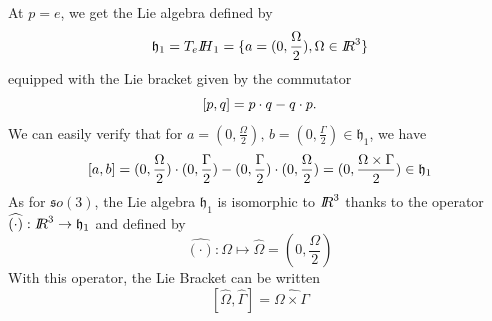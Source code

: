 At $p=e$, we get the Lie algebra defined by
\begin{equation}
  \label{eq:134}
  \mathfrak h_1 =  T_e{\mbox{\rm $I\!\!H$}_1} =  \{ a = (0, \frac \Omega 2 ), \Omega \in \mbox{\rm $I\!\!R$}^3 \}
\end{equation}
equipped with the Lie bracket given by the commutator
\begin{equation}
  \label{eq:135}
  [p,q] = p \cdot q- q\cdot p.
\end{equation}
We can easily verify that for $a = (0, \frac \Omega 2 ), \, b = (0, \frac \Gamma 2 ) \in \mathfrak h_1 $, we have
\begin{equation}
  \label{eq:136}
  [a,b] = (0, \frac \Omega 2 ) \cdot (0, \frac \Gamma 2 ) - (0, \frac \Gamma 2 ) \cdot  (0, \frac \Omega 2 )  = (0, \frac{\Omega\times \Gamma}{2}) \in \mathfrak h_1
\end{equation}
As for $\mathfrak so(3)$,  the Lie algebra $\mathfrak h_1$ is isomorphic to $\mbox{\rm $I\!\!R$}^3$ thanks to the operator $\widehat{(\cdot)} :\mbox{\rm $I\!\!R$}^3 \rightarrow \mathfrak h_1$ and defined by
\begin{equation}
  \label{eq:54}
 \widehat{(\cdot)}: \Omega \mapsto \widehat \Omega = (0, \frac \Omega 2 )
\end{equation}
With this operator, the Lie Bracket can be written
\begin{equation}
  \label{eq:137}
  [\widehat{\Omega},\widehat{\Gamma}] = \widehat{\Omega \times \Gamma}
\end{equation}


